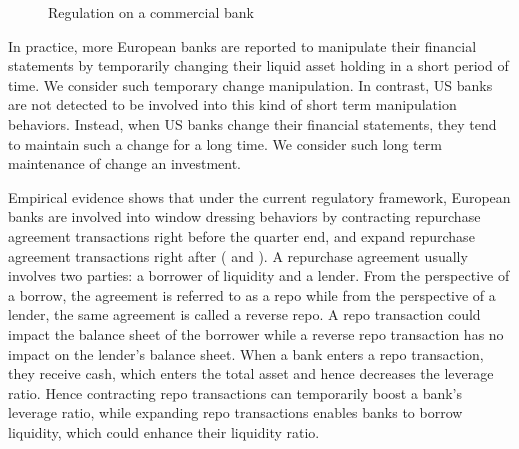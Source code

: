 \begin{figure}[h] 
\centering 
{}
\caption{Regulation on a commercial bank}
\label{fig: banking regulation}
  \end{figure}


In practice, more European banks are reported to manipulate their financial statements by temporarily changing their liquid asset holding in a short period of time. We consider such temporary change manipulation.
In contrast, US banks are not detected to be involved into this kind of short term manipulation behaviors. 
Instead, when US banks change their financial statements, they tend to maintain such a change for a long time. We consider such long term maintenance of change an investment.

Empirical evidence shows that under the current regulatory framework, European banks are involved into window dressing behaviors by contracting repurchase agreement transactions right before the quarter end, and expand repurchase agreement  transactions right after (\citet{window_dressing} and \citet{ECB_window}).
A repurchase agreement usually involves two parties: a borrower of liquidity and a lender.
From the perspective of a borrow, the agreement is referred to as a repo while from the perspective of a lender, the same agreement is called a reverse repo.
A repo transaction could impact the balance sheet of the borrower while a reverse repo transaction has no impact on the lender's balance sheet.
When a bank enters a repo transaction, they receive cash, which enters the total asset and hence decreases the leverage ratio.
Hence contracting repo transactions can  temporarily boost a bank's leverage ratio, while expanding repo transactions enables banks to borrow liquidity, which could enhance their liquidity ratio.


